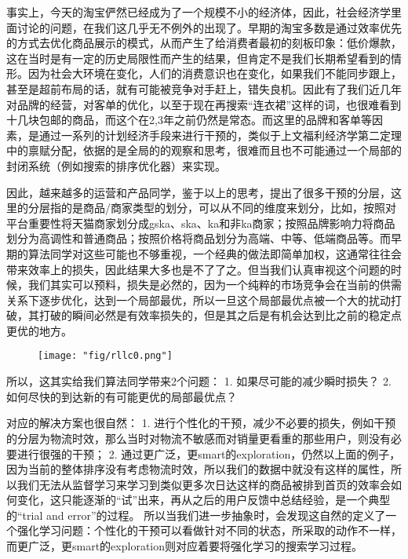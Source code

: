 事实上，今天的淘宝俨然已经成为了一个规模不小的经济体，因此，社会经济学里面讨论的问题，在我们这几乎无不例外的出现了。早期的淘宝多数是通过效率优先的方式去优化商品展示的模式，从而产生了给消费者最初的刻板印象：低价爆款，这在当时是有一定的历史局限性而产生的结果，但肯定不是我们长期希望看到的情形。因为社会大环境在变化，人们的消费意识也在变化，如果我们不能同步跟上，甚至是超前布局的话，就有可能被竞争对手赶上，错失良机。因此有了我们近几年对品牌的经营，对客单的优化，以至于现在再搜索“连衣裙”这样的词，也很难看到十几块包邮的商品，而这个在2,3年之前仍然是常态。而这里的品牌和客单等因素，是通过一系列的计划经济手段来进行干预的，类似于上文福利经济学第二定理中的禀赋分配，依据的是全局的的观察和思考，很难而且也不可能通过一个局部的封闭系统（例如搜索的排序优化器）来实现。

因此，越来越多的运营和产品同学，鉴于以上的思考，提出了很多干预的分层，这里的分层指的是商品/商家类型的划分，可以从不同的维度来划分，比如，按照对平台重要性将天猫商家划分成gska、ska、ka和非ka商家；按照品牌影响力将商品划分为高调性和普通商品；按照价格将商品划分为高端、中等、低端商品等。而早期的算法同学对这些可能也不够重视，一个经典的做法即简单加权，这通常往往会带来效率上的损失，因此结果大多也是不了了之。但当我们认真审视这个问题的时候，我们其实可以预料，损失是必然的，因为一个纯粹的市场竞争会在当前的供需关系下逐步优化，达到一个局部最优，所以一旦这个局部最优点被一个大的扰动打破，其打破的瞬间必然是有效率损失的，但是其之后是有机会达到比之前的稳定点更优的地方。

\begin{figure}[!h]
	\centering
	\texttt{[image: "fig/rllc0.png"]}
	\caption{}
	\label{fig:rllc0}
\end{figure}



所以，这其实给我们算法同学带来2个问题：
1. 如果尽可能的减少瞬时损失？
2. 如何尽快的到达新的有可能更优的局部最优点？

对应的解决方案也很自然：
1. 进行个性化的干预，减少不必要的损失，例如干预的分层为物流时效，那么当时对物流不敏感而对销量更看重的那些用户，则没有必要进行很强的干预；
2. 通过更广泛，更smart的exploration，仍然以上面的例子，因为当前的整体排序没有考虑物流时效，所以我们的数据中就没有这样的属性，所以我们无法从监督学习来学习到类似更多次日达这样的商品被排到首页的效率会如何变化，这只能逐渐的“试”出来，再从之后的用户反馈中总结经验，是一个典型的“trial and error”的过程。
所以当我们进一步抽象时，会发现这自然的定义了一个强化学习问题：个性化的干预可以看做针对不同的状态，所采取的动作不一样，而更广泛，更smart的exploration则对应着要将强化学习的搜索学习过程。


